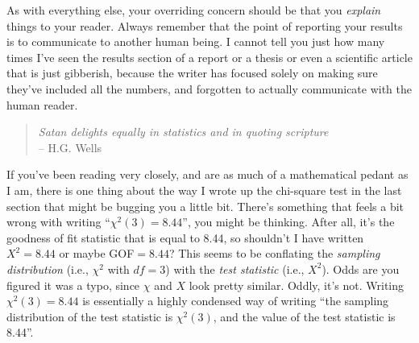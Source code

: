 As with everything else, your overriding concern should be that you {\it explain} things to your reader. Always remember that the point of reporting your results is to communicate to another human being. I cannot tell you just how many times I've seen the results section of a report or a thesis or even a scientific article that is just gibberish, because the writer has focused solely on making sure they've included all the numbers, and forgotten to actually communicate with the human reader. 


\begin{quote}
{\it Satan delights equally in statistics and in quoting scripture} \\
\hspace*{2cm} -- H.G. Wells
\end{quote}

\noindent
If you've been reading very closely, and are as much of a mathematical pedant as I am, there is one thing about the way I wrote up the chi-square test in the last section that might be bugging you a little bit. There's something that feels a bit wrong with writing ``$\chi^2(3) = 8.44$'', you might be thinking. After all, it's the goodness of fit statistic that is equal to 8.44, so shouldn't I have written $X^2 = 8.44$ or maybe GOF$=8.44$? This seems to be conflating the {\it sampling distribution} (i.e., $\chi^2$ with $df = 3$) with the {\it test statistic} (i.e., $X^2$). Odds are you figured it was a typo, since $\chi$ and $X$ look pretty similar. Oddly, it's not. Writing $\chi^2(3) = 8.44$ is essentially a highly condensed way of writing ``the sampling distribution of the test statistic is $\chi^2(3)$, and the value of the test statistic is 8.44''. 

